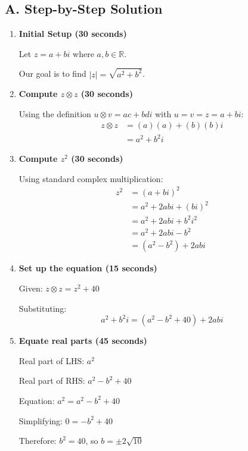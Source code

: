 \documentclass[12pt]{article}
\begin{document}
\begin{solutionbox}
\subsection*{A. Step-by-Step Solution}
\begin{enumerate}[leftmargin=*]
    \item \textbf{Initial Setup (30 seconds)}
    
    Let $z = a + bi$ where $a, b \in \mathbb{R}$.
    
    Our goal is to find $|z| = \sqrt{a^2 + b^2}$.
    
    \item \textbf{Compute $z \otimes z$ (30 seconds)}
    
    Using the definition $u \otimes v = ac + bdi$ with $u = v = z = a+bi$:
    \begin{align*}
        z \otimes z &= (a)(a) + (b)(b)i\\
        &= a^2 + b^2i
    \end{align*}
    
    \item \textbf{Compute $z^2$ (30 seconds)}
    
    Using standard complex multiplication:
    \begin{align*}
        z^2 &= (a+bi)^2\\
        &= a^2 + 2abi + (bi)^2\\
        &= a^2 + 2abi + b^2i^2\\
        &= a^2 + 2abi - b^2\\
        &= (a^2 - b^2) + 2abi
    \end{align*}
    
    \item \textbf{Set up the equation (15 seconds)}
    
    Given: $z \otimes z = z^2 + 40$
    
    Substituting:
    $$a^2 + b^2i = (a^2 - b^2 + 40) + 2abi$$
    
    \item \textbf{Equate real parts (45 seconds)}
    
    Real part of LHS: $a^2$
    
    Real part of RHS: $a^2 - b^2 + 40$
    
    Equation: $a^2 = a^2 - b^2 + 40$
    
    Simplifying: $0 = -b^2 + 40$
    
    Therefore: $b^2 = 40$, so $b = \pm 2\sqrt{10}$
    

\end{enumerate}
\end{solutionbox}
\end{document}
